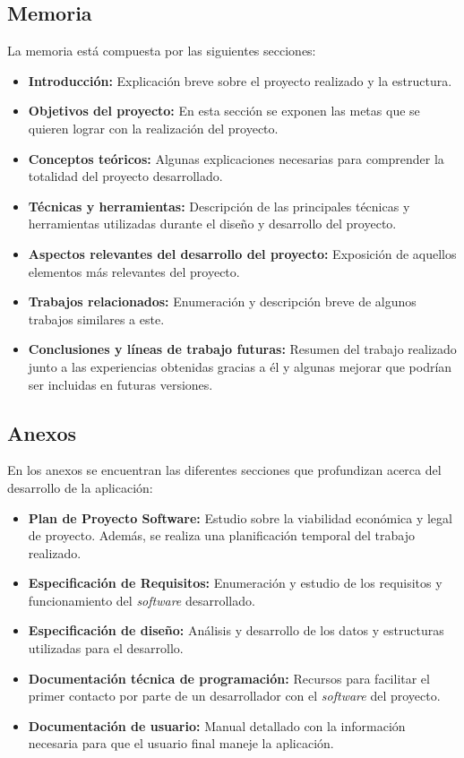 \subsection{Memoria}
La memoria está compuesta por las siguientes secciones:
\begin{itemize}
\item \textbf{Introducción:} Explicación breve sobre el proyecto realizado y la estructura.
\item \textbf{Objetivos del proyecto:} En esta sección se exponen las metas que se quieren lograr con la realización del proyecto.
\item \textbf{Conceptos teóricos:} Algunas explicaciones necesarias para comprender la totalidad del proyecto desarrollado.
\item \textbf{Técnicas y herramientas:} Descripción de las principales técnicas y herramientas utilizadas durante el diseño y desarrollo del proyecto.
\item \textbf{Aspectos relevantes del desarrollo del proyecto:} Exposición de aquellos elementos más relevantes del proyecto.
\item \textbf{Trabajos relacionados:} Enumeración y descripción breve de algunos trabajos similares a este.
\item \textbf{Conclusiones y líneas de trabajo futuras:} Resumen del trabajo realizado junto a las experiencias obtenidas gracias a él y algunas mejorar que podrían ser incluidas en futuras versiones.
\end{itemize}

\subsection{Anexos}
En los anexos se encuentran las diferentes secciones que profundizan acerca del desarrollo de la aplicación:
\begin{itemize}
\item \textbf{Plan de Proyecto Software:} Estudio sobre la viabilidad económica y legal de proyecto. Además, se realiza una planificación temporal del trabajo realizado.
\item \textbf{Especificación de Requisitos:} Enumeración y estudio de los requisitos y funcionamiento del \textit{software} desarrollado.
\item \textbf{Especificación de diseño:} Análisis y desarrollo de los datos y estructuras utilizadas para el desarrollo.
\item \textbf{Documentación técnica de programación:} Recursos para facilitar el primer contacto por parte de un desarrollador con el \textit{software} del proyecto.
\item \textbf{Documentación de usuario:} Manual detallado con la información necesaria para que el usuario final maneje la aplicación.
\end{itemize}
